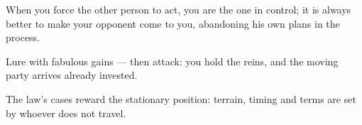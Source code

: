 

\begin{distilled}
  \item When you force the other person to act, you are the one in control; it is always better to make your opponent come to you, abandoning his own plans in the process.
  \item Lure with fabulous gains --- then attack: you hold the reins, and the moving party arrives already invested.
  \item The law's cases reward the stationary position: terrain, timing and terms are set by whoever does not travel.
\end{distilled}
